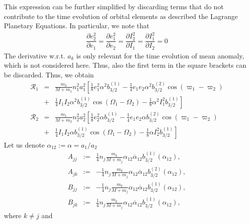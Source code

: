 \documentclass [12pt, a4paper] {article}
\newcommand{\pdiff}[2]
{
	\dfrac{\partial #1}{\partial #2}
}
\begin{document}
This expression can be further simplified by discarding terms that do not contribute 
to the time evolution of orbital elements as described the Lagrange Planetary Equations.
In particular, we note that 
\begin {eqnarray}
    \pdiff{e_2^2}{e_1} 
    = 
    \pdiff{e_1^2}{e_2} 
    = 
    \pdiff{I_2^2}{I_1}
    = 
    \pdiff{I_1^2}{I_2}
    = 
    0
\end {eqnarray}
The derivative w.r.t. $a_k$ is only relevant for the time evolution of mean anomaly,
which is not considered here. Thus, also the first term in the square brackets can be 
discarded. Thus, we obtain 
\begin {eqnarray}
    \label{eq:r_sec_1}
    \mathcal{R}_1
    &=&
    \frac{m_2}{M + m_1}n_1^2a_1^2
    \left[
        \frac{1}{8}e_1^2\alpha^2 b_{3/2}^{(1)}
        - 
        \frac{1}{4}e_1e_2\alpha^2b_{3/2}^{(2)}\cos(\varpi_1 - \varpi_2)
        \right.
        \\\nonumber
        &+&
        \left. 
        \frac{1}{4}I_1I_2\alpha^2b_{3/2}^{(1)}\cos(\Omega_1 - \Omega_2)
        - 
        \frac{1}{8}\alpha^2I_1^2b_{3/2}^{(1)}
    \right]
    \\
    \label{eq:r_sec_2}
    \mathcal{R}_2
    &=&
    \frac{m_1}{M + m_2}n_2^2a_2^2
    \left[
        \frac{1}{8}e_2^2\alpha b_{3/2}^{(1)}
        - 
        \frac{1}{4}e_1e_2\alpha b_{3/2}^{(2)}\cos(\varpi_1 - \varpi_2)
        \right.
        \\\nonumber
        &+&
        \left. 
        \frac{1}{4}I_1I_2\alpha b_{3/2}^{(1)}\cos(\Omega_1 - \Omega_2)
        - 
        \frac{1}{8}\alpha I_2^2b_{3/2}^{(1)}
    \right]
\end {eqnarray}
Let us denote $\alpha_{12} := \alpha = a_1 / a_2$
\begin {eqnarray}
    A_{jj} 
    &:=& 
    \frac{1}{4}
    n_j
    \frac{m_k}{M + m_j}
    \alpha_{12}\overline\alpha_{12}
    b_{3/2}^{(1)}(\alpha_{12}),
    \\
    A_{jk} 
    &:=& 
    -\frac{1}{4}
    n_j
    \frac{m_k}{M + m_j}
    \alpha_{12}\overline\alpha_{12}
    b_{3/2}^{(2)}(\alpha_{12}),
    \\
    B_{jj} 
    &:=& 
    -\frac{1}{4}
    n_j
    \frac{m_k}{M + m_j}
    \alpha_{12}\overline\alpha_{12}
    b_{3/2}^{(1)}(\alpha_{12}),
    \\
    B_{jk} 
    &:=& 
    \frac{1}{4}
    n_j
    \frac{m_k}{M + m_j}
    \alpha_{12}\overline\alpha_{12}
    b_{3/2}^{(1)}(\alpha_{12}),
\end {eqnarray}
where $k\neq j$ and 
\end{document}
